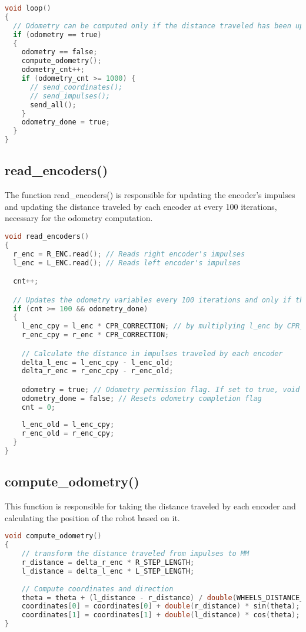 \begin{lstlisting}[language=C]
void loop()
{
  // Odometry can be computed only if the distance traveled has been updated
  if (odometry == true)
  {
    odometry == false;
    compute_odometry();
    odometry_cnt++;
    if (odometry_cnt >= 1000) {
      // send_coordinates();
      // send_impulses();
      send_all();
    }
    odometry_done = true;
  }
}
\end{lstlisting}

\subsection{read\_encoders()}
The function read\_encoders() is responsible for updating the encoder's impulses and updating the distance traveled by each encoder at every 100 iterations, necessary for the odometry computation.

\begin{lstlisting}[language=C]
void read_encoders()
{
  r_enc = R_ENC.read(); // Reads right encoder's impulses
  l_enc = L_ENC.read(); // Reads left encoder's impulses

  cnt++;

  // Updates the odometry variables every 100 iterations and only if the last odometry computation has finished
  if (cnt >= 100 && odometry_done)
  {
    l_enc_cpy = l_enc * CPR_CORRECTION; // by multiplying l_enc by CPR_CORRECTION it is taken in consideration the gear ratio error
    r_enc_cpy = r_enc * CPR_CORRECTION;

    // Calculate the distance in impulses traveled by each encoder
    delta_l_enc = l_enc_cpy - l_enc_old;
    delta_r_enc = r_enc_cpy - r_enc_old;

    odometry = true; // Odometry permission flag. If set to true, void loop() can compute the odometry
    odometry_done = false; // Resets odometry completion flag
    cnt = 0;
    
    l_enc_old = l_enc_cpy; 
    r_enc_old = r_enc_cpy;
  }
}
\end{lstlisting}

\subsection{compute\_odometry()}
This function is responsible for taking the distance traveled by each encoder and calculating the position of the robot based on it.

\begin{lstlisting}[language=C]
void compute_odometry()
{
    // transform the distance traveled from impulses to MM
    r_distance = delta_r_enc * R_STEP_LENGTH;
    l_distance = delta_l_enc * L_STEP_LENGTH;
      
    // Compute coordinates and direction
    theta = theta + (l_distance - r_distance) / double(WHEELS_DISTANCE_MM);
    coordinates[0] = coordinates[0] + double(r_distance) * sin(theta);
    coordinates[1] = coordinates[1] + double(l_distance) * cos(theta);
}
\end{lstlisting}

